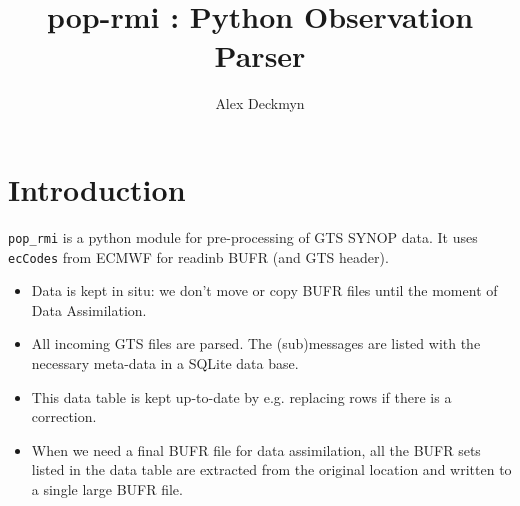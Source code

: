 \documentclass[10pt]{article}
\begin{document}
\begin{titlepage}
  \title{
    pop-rmi : Python Observation Parser
   }
\author{Alex Deckmyn}
  \maketitle
{}

\end{titlepage}
\section{Introduction}
\texttt{pop\_rmi} is a python module for pre-processing of GTS SYNOP data. It uses \texttt{ecCodes} from ECMWF for readinb BUFR (and GTS header).

\begin{itemize}
\item Data is kept in situ: we don't move or copy BUFR files until the moment of Data Assimilation.
\item All incoming GTS files are parsed. The (sub)messages are listed with the necessary meta-data in a SQLite data base.
\item This data table is kept up-to-date by e.g. replacing rows if there is a correction.
\item When we need a final BUFR file for data assimilation, all the BUFR sets listed in the data table are extracted from the original location and written to a single large BUFR file.
\end{itemize}
\end{document}
